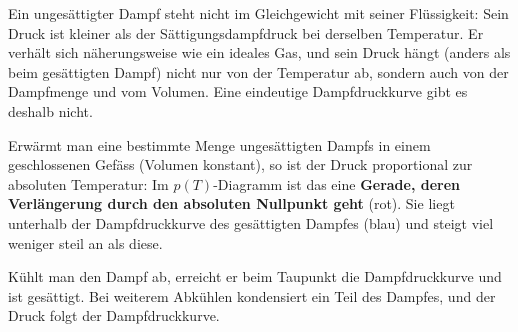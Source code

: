 Ein ungesättigter Dampf steht nicht im Gleichgewicht mit seiner Flüssigkeit: Sein Druck ist kleiner als der Sättigungsdampfdruck bei derselben Temperatur. Er verhält sich näherungsweise wie ein ideales Gas, und sein Druck hängt (anders als beim gesättigten Dampf) nicht nur von der Temperatur ab, sondern auch von der Dampfmenge und vom Volumen. Eine eindeutige Dampfdruckkurve gibt es deshalb nicht.

Erwärmt man eine bestimmte Menge ungesättigten Dampfs in einem geschlossenen Gefäss (Volumen konstant), so ist der Druck proportional zur absoluten Temperatur: Im $p(T)$-Diagramm ist das eine \textbf{Gerade, deren Verlängerung durch den absoluten Nullpunkt geht} (rot). Sie liegt unterhalb der Dampfdruckkurve des gesättigten Dampfes (blau) und steigt viel weniger steil an als diese.

\begin{center}
\end{center}

Kühlt man den Dampf ab, erreicht er beim Taupunkt die Dampfdruckkurve und ist gesättigt. Bei weiterem Abkühlen kondensiert ein Teil des Dampfes, und der Druck folgt der Dampfdruckkurve.

